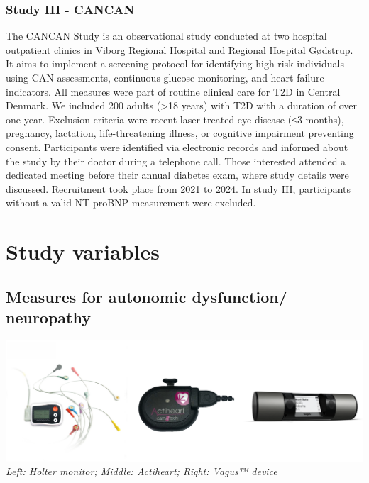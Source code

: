 \documentclass[
  letterpaper,
  headsepline=true,
  open=any]{scrbook}
\begin{document}
\hypertarget{study-iii---cancan}{%
\subsubsection{Study III - CANCAN}\label{study-iii---cancan}}

The CANCAN Study is an observational study conducted at two hospital
outpatient clinics in Viborg Regional Hospital and Regional Hospital
Gødstrup. It aims to implement a screening protocol for identifying
high-risk individuals using CAN assessments, continuous glucose
monitoring, and heart failure indicators. All measures were part of
routine clinical care for T2D in Central Denmark. We included 200 adults
(\textgreater18 years) with T2D with a duration of over one year.
Exclusion criteria were recent laser-treated eye disease (≤3 months),
pregnancy, lactation, life-threatening illness, or cognitive impairment
preventing consent. Participants were identified via electronic records
and informed about the study by their doctor during a telephone call.
Those interested attended a dedicated meeting before their annual
diabetes exam, where study details were discussed. Recruitment took
place from 2021 to 2024. In study III, participants without a valid
NT-proBNP measurement were excluded.

\hypertarget{study-variables}{%
\section{Study variables}\label{study-variables}}

\hypertarget{measures-for-autonomic-dysfunction-neuropathy}{%
\subsection{Measures for autonomic dysfunction/
neuropathy}\label{measures-for-autonomic-dysfunction-neuropathy}}

\includegraphics{images/can_tools.pdf} \emph{Left: Holter monitor;
Middle: Actiheart; Right: Vagus™ device}
\end{document}
